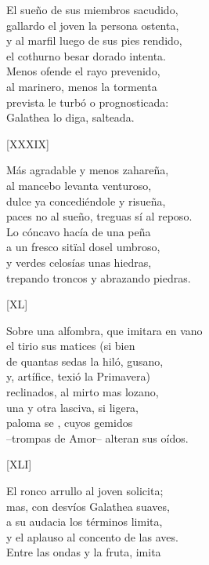 \documentclass[11pt,a4paper,twoside]{article}
\newcommand{\ch}{\emph{\textsc{Ch}}}
\newcommand{\guno}{\emph{G1}}
\begin{document}
El sueño de sus miembros sacudido,\\
gallardo el joven la persona ostenta,\\
y al marfil luego de sus pies rendido,\\
el cothurno besar dorado intenta.\\
Menos ofende el rayo prevenido,\\
al marinero, menos la tormenta\\
prevista le turbó o prognosticada:\\
Galathea lo diga, salteada.\par\pend 
%
\begin{center}
	[XXXIX]
\end{center}\pstart
Más agradable y menos zahareña,\\
al mancebo levanta venturoso,\\
dulce ya concediéndole y risueña,\\
paces no al sueño, treguas sí al reposo.\\
Lo cóncavo hacía de una peña\\
a un fresco sitïal dosel umbroso,\\
y verdes celosías unas hiedras,\\
trepando troncos y abrazando piedras.\par\pend
%
\begin{center}
	[XL]
\end{center}\pstart
Sobre una alfombra, que imitara en vano\\
el tirio sus matices (si bien \edtext{era}{\Afootnote{ora {\ch}}}\\
de quantas sedas la hiló, gusano,\\
y, artífice, texió la Primavera)\\
reclinados, al mirto mas lozano,\\
una y otra lasciva, si ligera,\\
paloma se \edtext{caló}{\Afootnote{callo {\guno}}}, cuyos gemidos\\
--trompas de Amor-- alteran sus oídos.\par\pend
%
\begin{center}
	[XLI]
\end{center}\pstart
El ronco arrullo al joven solicita;\\
mas, con desvíos Galathea suaves,\\
a su audacia los términos limita,\\
y el aplauso al concento de las aves.\\
Entre las ondas y la fruta, imita\\
\end{document}

